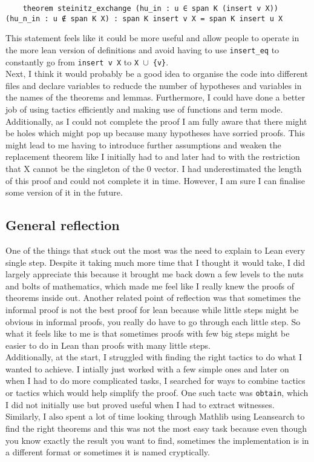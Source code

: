 \documentclass{article}
\begin{document}
\begin{lstlisting}
    theorem steinitz_exchange (hu_in : u ∈ span K (insert v X)) (hu_n_in : u ∉ span K X) : span K insert v X = span K insert u X
\end{lstlisting}

This statement feels like it could be more useful and allow people to operate in the more lean version of definitions and avoid having to use \texttt{insert\_eq} to constantly go from \texttt{insert v X} to \texttt{X $\cup$ \{v\}}.\\

Next, I think it would probably be a good idea to organise the code into different files and declare variables to reducde the number of hypotheses and variables in the names of the theorems and lemmas. Furthermore, I could have done a better job of using tactics efficiently and making use of functions and term mode.\\

Additionally, as I could not complete the proof I am fully aware that there might be holes which might pop up because many hypotheses have sorried proofs. This might lead to me having to introduce further assumptions and weaken the replacement theorem like I initially had to and later had to with the restriction that X cannot be the singleton of the 0 vector. I had underestimated the length of this proof and could not complete it in time. However, I am sure I can finalise some version of it in the future.

\subsection{General reflection}

One of the things that stuck out the most was the need to explain to Lean every single step. Despite it taking much more time that I thought it would take, I did largely appreciate this because it brought me back down a few levels to the nuts and bolts of mathematics, which made me feel like I really knew the proofs of theorems inside out. Another related point of reflection was that sometimes the informal proof is not the best proof for lean because while little steps might be obvious in informal proofs, you really do have to go through each little step. So what it feels like to me is that sometimes proofs with few big steps might be easier to do in Lean than proofs with many little steps.\\

Additionally, at the start, I struggled with finding the right tactics to do what I wanted to achieve. I intially just worked with a few simple ones and later on when I had to do more complicated tasks, I searched for ways to combine tactics or tactics which would help simplify the proof. One such tactc was \texttt{obtain}, which I did not initially use but proved useful when I had to extract witnesses. Similarly, I also spent a lot of time looking through Mathlib using Leansearch to find the right theorems and this was not the most easy task because even though you know exactly the result you want to find, sometimes the implementation is in a different format or sometimes it is named cryptically. \\
\end{document}
